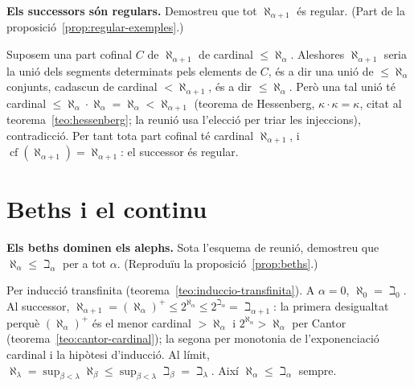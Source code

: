 \begin{exercici}
\textbf{Els successors són regulars.} Demostreu que tot \(\aleph_{\alpha+1}\) és regular. (Part de la proposició~\ref{prop:regular-exemples}.)
\end{exercici}
\begin{solucio}
Suposem una part cofinal \(C\) de \(\aleph_{\alpha+1}\) de cardinal \(\le\aleph_\alpha\). Aleshores \(\aleph_{\alpha+1}\) seria la unió dels segments determinats pels elements de \(C\), és a dir una unió de \(\le\aleph_\alpha\) conjunts, cadascun de cardinal \(<\aleph_{\alpha+1}\), és a dir \(\le\aleph_\alpha\). Però una tal unió té cardinal \(\le\aleph_\alpha\cdot\aleph_\alpha=\aleph_\alpha<\aleph_{\alpha+1}\) (teorema de Hessenberg, \(\kappa\cdot\kappa=\kappa\), citat al teorema~\ref{teo:hessenberg}; la reunió usa l'elecció per triar les injeccions), contradicció. Per tant tota part cofinal té cardinal \(\aleph_{\alpha+1}\), i \(\operatorname{cf}(\aleph_{\alpha+1})=\aleph_{\alpha+1}\): el successor és regular.
\end{solucio}

\section{Beths i el continu}\label{prac:beths-continu}

\begin{exercici}
\textbf{Els beths dominen els alephs.} Sota l'esquema de reunió, demostreu que \(\aleph_\alpha\le\beth_\alpha\) per a tot \(\alpha\). (Reproduïu la proposició~\ref{prop:beths}.)
\end{exercici}
\begin{solucio}
Per inducció transfinita (teorema~\ref{teo:induccio-transfinita}). A \(\alpha=0\), \(\aleph_0=\beth_0\). Al successor, \(\aleph_{\alpha+1}=(\aleph_\alpha)^+\le 2^{\aleph_\alpha}\le 2^{\beth_\alpha}=\beth_{\alpha+1}\): la primera desigualtat perquè \((\aleph_\alpha)^+\) és el menor cardinal \(>\aleph_\alpha\) i \(2^{\aleph_\alpha}>\aleph_\alpha\) per Cantor (teorema~\ref{teo:cantor-cardinal}); la segona per monotonia de l'exponenciació cardinal i la hipòtesi d'inducció. Al límit, \(\aleph_\lambda=\sup_{\beta<\lambda}\aleph_\beta\le\sup_{\beta<\lambda}\beth_\beta=\beth_\lambda\). Així \(\aleph_\alpha\le\beth_\alpha\) sempre.
\end{solucio}

